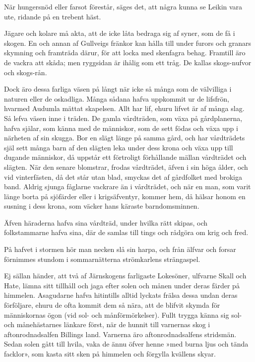 När hungersnöd eller farsot förestår, säges det, att några kunna se
Leikin vara ute, ridande på en trebent häst.

Jägare och kolare må akta, att de icke låta bedraga sig af syner, som de
få i skogen. En och annan af Gullveigs fränkor kan hålla till under
furors och granars skymning och
\protect\hypertarget{lb1625905.xhtmlux5cux23start178}{}{}\protect\hypertarget{lb1625905.xhtmlux5cux23start178-a}{}{}\protect\hypertarget{lb1625905.xhtmlux5cux23start178-b}{}{}\protect\hypertarget{lb1625905.xhtmlux5cux23start178-c}{}{}\protect\hypertarget{lb1625905.xhtmlux5cux23start178-d}{}{}
framträda därur, för att locka med skenfagra behag. Framtill äro de
vackra att skåda; men ryggsidan är ihålig som ett tråg. De kallas
skogs-nufvor och skogs-rån.

Dock äro dessa farliga väsen på långt när icke så många som de
välvilliga i naturen eller de oskadliga. Många sådana hafva uppkommit ur
de lifsfrön, hvarmed Audumla mättat skapelsen. Allt har lif, ehuru
lifvet är af många slag. Så lefva väsen inne i träden. De gamla
vårdträden, som växa på gårdplanerna, hafva själar, som känna med de
människor, som de sett födas och växa upp i närheten af sin skugga. Bor
en slägt länge på samma gård, och har vårdträdets själ sett många barn
af den slägten leka under dess krona och växa upp till dugande
människor, då uppstår ett förtroligt förhållande mällan vårdträdet och
slägten. När den senare blomstrar, frodas vårdträdet, äfven i sin höga
ålder, och vid vinterfästen, då det står utan blad, smyckas det af
gårdfolket med brokiga band. Aldrig sjunga fåglarne vackrare än i
vårdträdet, och när en man, som varit länge borta på sjöfärder eller i
krigsäfventyr, kommer hem, då hälsar honom en susning i dess krona, som
väcker hans käraste barndomsminnen.

Äfven häraderna hafva sina vårdträd, under hvilka rätt skipas, och
folkstammarne hafva sina, där de samlas till tings och rådgöra om krig
och fred.

På hafvet i stormen hör man necken slå sin harpa, och från älfvar och
forsar förnimmes stundom i sommarnätterna strömkarlens strängaspel.

Ej sällan händer, att två af Järnskogens farligaste Lokesöner, ulfvarne
Skall och Hate, lämna sitt tillhåll och jaga efter solen och månen under
deras färder på himmelen. Asagudarne hafva hitintills alltid lyckats
frälsa dessa undan deras förföljare, ehuru de ofta kommit dem så nära,
att de blifvit skymda för människornas ögon (vid sol- och
månförmörkelser). Fullt trygga känna sig sol- och månehästarnes länkare
först, när de hunnit till varnernas skog i aftonrodnadsalfen Billings
land. Varnerna äro aftonrodnadsalfens stridsmän. Sedan solen
\protect\hypertarget{lb1625905.xhtmlux5cux23start179}{}{}\protect\hypertarget{lb1625905.xhtmlux5cux23start179-a}{}{}\protect\hypertarget{lb1625905.xhtmlux5cux23start179-b}{}{}\protect\hypertarget{lb1625905.xhtmlux5cux23start179-c}{}{}\protect\hypertarget{lb1625905.xhtmlux5cux23start179-d}{}{}
gått till hvila, vaka de ännu öfver henne »med burna ljus och tända
facklor», som kasta sitt sken på himmelen och förgylla kvällens skyar.

